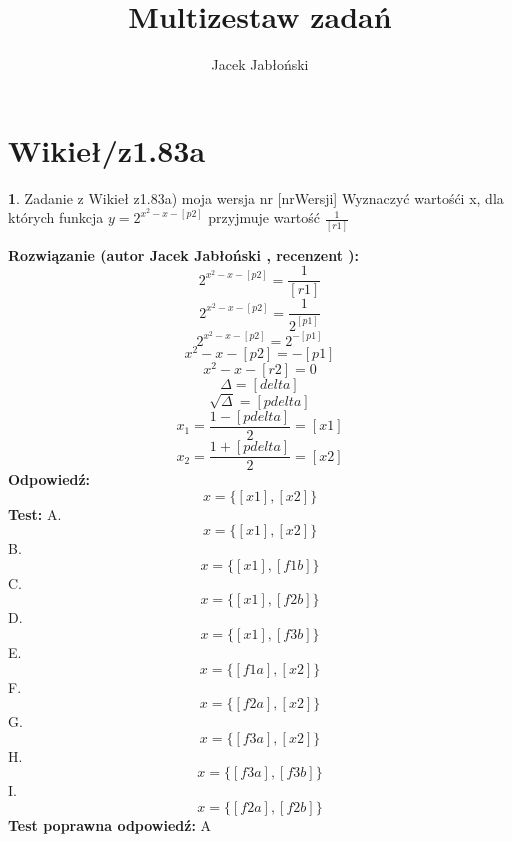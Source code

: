 \documentclass[12pt, a4paper]{article}
\title{Multizestaw zadań}
\author{Jacek Jabłoński}
\date{}
\theoremstyle{definition} %
\newtheorem{zad}{}
\newcommand{\kategoria}[1]{\section{#1}} %
\newcommand{\zadStart}[1]{\begin{zad}#1\newline} %
\newcommand{\zadStop}{\end{zad}}   %
\newcommand{\rozwStart}[2]{\noindent \textbf{Rozwiązanie (autor #1 , recenzent #2): }\newline} %
\newcommand{\rozwStop}{\newline}                                            %
\newcommand{\odpStart}{\noindent \textbf{Odpowiedź:}\newline}    %
\newcommand{\odpStop}{\newline}                                             %
\newcommand{\testStart}{\noindent \textbf{Test:}\newline} %
\newcommand{\testStop}{\newline} %
\newcommand{\kluczStart}{\noindent \textbf{Test poprawna odpowiedź:}\newline} %
\newcommand{\kluczStop}{\newline} %
\begin{document}
\maketitle


\kategoria{Wikieł/z1.83a}
\zadStart{Zadanie z Wikieł z1.83a) moja wersja nr [nrWersji]}
Wyznaczyć wartośći x, dla których funkcja $y=2^{x^2-x-[p2]}$ przyjmuje wartość $\frac{1}{[r1]}$
\zadStop
\rozwStart{Jacek Jabłoński}{}
$$2^{x^2-x-[p2]} = \frac{1}{[r1]} $$
$$2^{x^2-x-[p2]} = \frac{1}{2^{[p1]}} $$
$$2^{x^2-x-[p2]} = 2^{-[p1]}$$
$$x^2-x-[p2] = -[p1]$$
$$x^2-x-[r2] = 0$$
$$\Delta = [delta]$$
$$\sqrt{\Delta} = [pdelta]$$
$$x_1 = \frac{1 - [pdelta]}{2} = [x1]$$
$$x_2 = \frac{1 + [pdelta]}{2} = [x2]$$
\rozwStop
\odpStart
$$x=\{[x1],[x2]\}$$
\odpStop
\testStart
A. $$x=\{[x1],[x2]\}$$
B. $$x=\{[x1],[f1b]\}$$
C. $$x=\{[x1],[f2b]\}$$
D. $$x=\{[x1],[f3b]\}$$
E. $$x=\{[f1a],[x2]\}$$
F. $$x=\{[f2a],[x2]\}$$
G. $$x=\{[f3a],[x2]\}$$
H. $$x=\{[f3a],[f3b]\}$$
I. $$x=\{[f2a],[f2b]\}$$
\testStop
\kluczStart
A
\kluczStop
\end{document}
